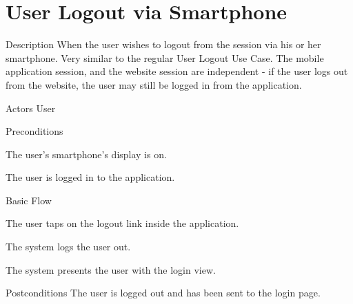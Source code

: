 \section{User Logout via Smartphone}

\begin{cpart}{Description}
When the user wishes to logout from the session via his or her smartphone. Very similar to the regular User Logout Use Case. The mobile application session, and the website session are independent - if the user logs out from the website, the user may still be logged in from the application.
\end{cpart}

\begin{cpart}{Actors}
User
\end{cpart}

\begin{cpartList}{Preconditions}
\item The user's smartphone's display is on.
\item The user is logged in to the application.
\end{cpartList}

\begin{cpartList}{Basic Flow}
\item The user taps on the logout link inside the application.
\item The system logs the user out.
\item The system presents the user with the login view.
\end{cpartList}

\begin{cpart}{Postconditions}
The user is logged out and has been sent to the login page.
\end{cpart}

\clearpage

